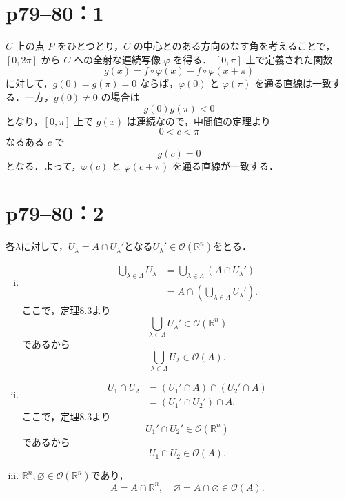 \section*{p79--80：1}
\begin{tproof}
    $C$ 上の点 $P$ をひとつとり，$C$ の中心とのある方向のなす角を考えることで，
    $[0,2\pi]$ から $C$ への全射な連続写像 $\varphi$ を得る．
    $[0,\pi]$ 上で定義された関数
    \[
        g(x) = f\circ \varphi(x) - f \circ \varphi(x+\pi)
    \]
    に対して，$g(0) = g(\pi) = 0$ ならば，$\varphi(0)$ と $\varphi(\pi)$ を通る直線は一致する．一方，$g(0) \ne 0$ の場合は
    \[
        g(0)g(\pi) < 0
    \]
    となり，$[0,\pi]$ 上で $g(x)$ は連続なので，中間値の定理より
    \[
        0 < c < \pi
    \]
    なるある $c$ で
    \[
        g(c) = 0
    \]
    となる．よって，$\varphi(c)$ と $\varphi(c+\pi)$ を通る直線が一致する．
\end{tproof}


\section*{p79--80：2}
\begin{tproof}
    各$\lambda$に対して，$U_\lambda= A \cap U_\lambda '$となる$ U_\lambda ' \in \mathcal{O} (\mathbb{R}^n)$をとる．
    \begin{enumerate}[(i)]
        \item
              \begin{align*}
                  \bigcup_{\lambda \in \Lambda} U_\lambda & = \bigcup_{\lambda \in \Lambda} (A \cap U_\lambda ')  \\
                                                          & = A \cap (\bigcup_{\lambda \in \Lambda} U_\lambda ').
              \end{align*}
              ここで，定理8.3より
              \[
                  \bigcup_{\lambda \in \Lambda} U_\lambda ' \in \mathcal{O} (\mathbb{R}^n)
              \]
              であるから
              \[
                  \bigcup_{\lambda \in \Lambda} U_\lambda \in \mathcal{O} (A).
              \]
        \item
              \begin{align*}
                  U_1 \cap U_2 & = (U_1 ' \cap A) \cap (U_2 ' \cap A) \\
                               & = (U_1 ' \cap U_2 ') \cap A.
              \end{align*}
              ここで，定理8.3より
              \[
                  U_1 ' \cap U_2 ' \in \mathcal{O} (\mathbb{R}^n)
              \]
              であるから
              \[
                  U_1 \cap U_2 \in \mathcal{O} (A).
              \]
        \item
              $\mathbb{R}^n, \varnothing \in \mathcal{O} (\mathbb{R}^n)$であり，
              \[
                  A = A \cap \mathbb{R}^n, \quad \varnothing = A \cap \varnothing \in \mathcal{O} (A).
              \]
    \end{enumerate}
\end{tproof}


